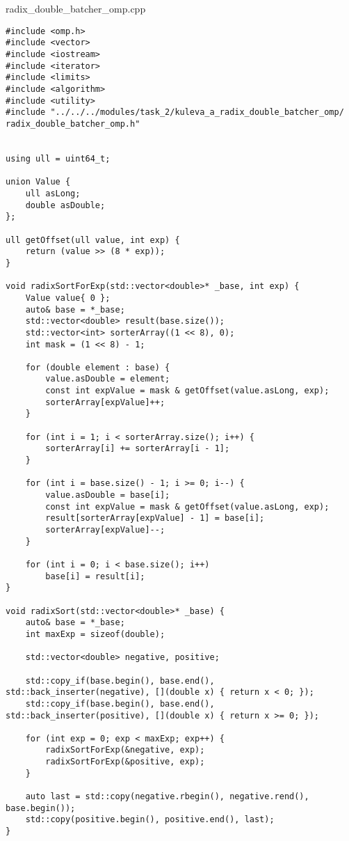 \documentclass[12pt,a4paper]{article}
\begin{document}
\section{} radix\_double\_batcher\_omp.cpp
\begin{lstlisting}
#include <omp.h>
#include <vector>
#include <iostream>
#include <iterator>
#include <limits>
#include <algorithm>
#include <utility>
#include "../../../modules/task_2/kuleva_a_radix_double_batcher_omp/ radix_double_batcher_omp.h"


using ull = uint64_t;

union Value {
    ull asLong;
    double asDouble;
};

ull getOffset(ull value, int exp) {
    return (value >> (8 * exp));
}

void radixSortForExp(std::vector<double>* _base, int exp) {
    Value value{ 0 };
    auto& base = *_base;
    std::vector<double> result(base.size());
    std::vector<int> sorterArray((1 << 8), 0);
    int mask = (1 << 8) - 1;

    for (double element : base) {
        value.asDouble = element;
        const int expValue = mask & getOffset(value.asLong, exp);
        sorterArray[expValue]++;
    }

    for (int i = 1; i < sorterArray.size(); i++) {
        sorterArray[i] += sorterArray[i - 1];
    }

    for (int i = base.size() - 1; i >= 0; i--) {
        value.asDouble = base[i];
        const int expValue = mask & getOffset(value.asLong, exp);
        result[sorterArray[expValue] - 1] = base[i];
        sorterArray[expValue]--;
    }

    for (int i = 0; i < base.size(); i++)
        base[i] = result[i];
}

void radixSort(std::vector<double>* _base) {
    auto& base = *_base;
    int maxExp = sizeof(double);

    std::vector<double> negative, positive;

    std::copy_if(base.begin(), base.end(), std::back_inserter(negative), [](double x) { return x < 0; });
    std::copy_if(base.begin(), base.end(), std::back_inserter(positive), [](double x) { return x >= 0; });

    for (int exp = 0; exp < maxExp; exp++) {
        radixSortForExp(&negative, exp);
        radixSortForExp(&positive, exp);
    }

    auto last = std::copy(negative.rbegin(), negative.rend(), base.begin());
    std::copy(positive.begin(), positive.end(), last);
}


\end{lstlisting}
\end{document}
